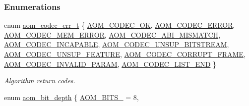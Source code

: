 \subsubsection*{Enumerations}
\begin{DoxyCompactItemize}
\item 
enum \hyperlink{group__codec_gaaae61e0f8663e6137f1e228757248e7c}{aom\+\_\+codec\+\_\+err\+\_\+t} \{ \newline
\hyperlink{group__codec_ggaaae61e0f8663e6137f1e228757248e7caf145dc2f86014a08ebad36ac2b140001}{A\+O\+M\+\_\+\+C\+O\+D\+E\+C\+\_\+\+OK}, 
\hyperlink{group__codec_ggaaae61e0f8663e6137f1e228757248e7ca20f818786bc939e6e58192f6a150d691}{A\+O\+M\+\_\+\+C\+O\+D\+E\+C\+\_\+\+E\+R\+R\+OR}, 
\hyperlink{group__codec_ggaaae61e0f8663e6137f1e228757248e7caa4328d9fc527a3fd3cf76eb54e3db1a2}{A\+O\+M\+\_\+\+C\+O\+D\+E\+C\+\_\+\+M\+E\+M\+\_\+\+E\+R\+R\+OR}, 
\hyperlink{group__codec_ggaaae61e0f8663e6137f1e228757248e7ca7cbf0a1ff28bf7c460f6d86d63b30842}{A\+O\+M\+\_\+\+C\+O\+D\+E\+C\+\_\+\+A\+B\+I\+\_\+\+M\+I\+S\+M\+A\+T\+CH}, 
\newline
\hyperlink{group__codec_ggaaae61e0f8663e6137f1e228757248e7cac4a4eea6394661cef74abf674c12cfa8}{A\+O\+M\+\_\+\+C\+O\+D\+E\+C\+\_\+\+I\+N\+C\+A\+P\+A\+B\+LE}, 
\hyperlink{group__codec_ggaaae61e0f8663e6137f1e228757248e7ca38b6a9786805f6c215cff72985cc6fdb}{A\+O\+M\+\_\+\+C\+O\+D\+E\+C\+\_\+\+U\+N\+S\+U\+P\+\_\+\+B\+I\+T\+S\+T\+R\+E\+AM}, 
\hyperlink{group__codec_ggaaae61e0f8663e6137f1e228757248e7ca94436b9b9d07909fe2e85b39ef0b5615}{A\+O\+M\+\_\+\+C\+O\+D\+E\+C\+\_\+\+U\+N\+S\+U\+P\+\_\+\+F\+E\+A\+T\+U\+RE}, 
\hyperlink{group__codec_ggaaae61e0f8663e6137f1e228757248e7ca8b4b7f7b3ea2a3a0e07b82c9170775a2}{A\+O\+M\+\_\+\+C\+O\+D\+E\+C\+\_\+\+C\+O\+R\+R\+U\+P\+T\+\_\+\+F\+R\+A\+ME}, 
\newline
\hyperlink{group__codec_ggaaae61e0f8663e6137f1e228757248e7ca0c6ff8587f8bcc0429aecfa9fe2762df}{A\+O\+M\+\_\+\+C\+O\+D\+E\+C\+\_\+\+I\+N\+V\+A\+L\+I\+D\+\_\+\+P\+A\+R\+AM}, 
\hyperlink{group__codec_ggaaae61e0f8663e6137f1e228757248e7ca413c6090fa855359106e32fbd2b5f668}{A\+O\+M\+\_\+\+C\+O\+D\+E\+C\+\_\+\+L\+I\+S\+T\+\_\+\+E\+ND}
 \}\begin{DoxyCompactList}\small\item\em Algorithm return codes. \end{DoxyCompactList}
\item 
enum \hyperlink{group__codec_ga6ed0e98eba4651c1ad845e39498e4153}{aom\+\_\+bit\+\_\+depth} \{ \hyperlink{group__codec_gga6ed0e98eba4651c1ad845e39498e4153a4c7f55539160206a3fbb2a6cfc9ef89c}{A\+O\+M\+\_\+\+B\+I\+T\+S\+\_} = 8, 

\end{DoxyCompactItemize}
